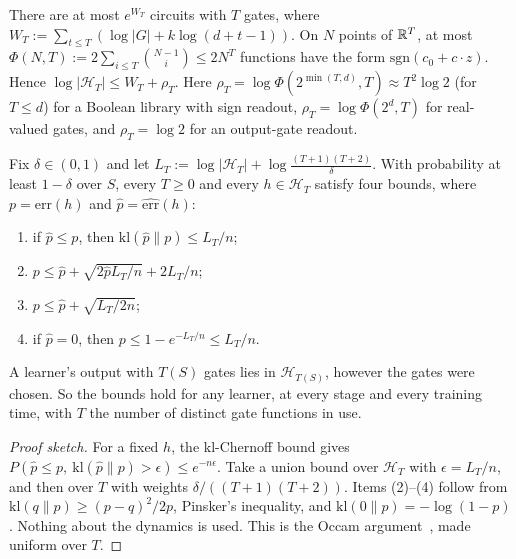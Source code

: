 \begin{lemma}\label{lem:app-disc-count}
\quad There are at most $e^{W_T}$ circuits with $T$ gates, where $W_T:=\sum_{t\le T}(\log|G|+k\log(d+t-1))$. On $N$ points of $\mathbb{R}^T$, at most $\Phi(N,T):=2\sum_{i\le T}\binom{N-1}{i}\le2N^T$ functions have the form $\mathrm{sgn}(c_0+c\cdot z)$. Hence $\log|\mathcal H_T|\le W_T+\rho_T$. Here $\rho_T=\log\Phi(2^{\min(T,d)},T)\approx T^2\log2$ (for $T\le d$) for a Boolean library with sign readout, $\rho_T=\log\Phi(2^d,T)$ for real-valued gates, and $\rho_T=\log2$ for an output-gate readout.
\end{lemma}

\begin{theorem}\label{thm:app-A1}
\quad Fix $\delta\in(0,1)$ and let $L_T:=\log|\mathcal H_T|+\log\frac{(T+1)(T+2)}{\delta}$. With probability at least $1-\delta$ over $S$, every $T\ge0$ and every $h\in\mathcal H_T$ satisfy four bounds, where $p=\mathrm{err}(h)$ and $\hat p=\widehat{\mathrm{err}}(h)$:
\begin{enumerate}[label=(\arabic*),nosep]
\item if $\hat p\le p$, then $\mathrm{kl}(\hat p\|p)\le L_T/n$;
\item $p\le\hat p+\sqrt{2\hat pL_T/n}+2L_T/n$;
\item $p\le\hat p+\sqrt{L_T/2n}$;
\item if $\hat p=0$, then $p\le1-e^{-L_T/n}\le L_T/n$.
\end{enumerate}
A learner's output with $T(S)$ gates lies in $\mathcal H_{T(S)}$, however the gates were chosen. So the bounds hold for any learner, at every stage and every training time, with $T$ the number of distinct gate functions in use.
\end{theorem}
\begin{proof}[Proof sketch]
For a fixed $h$, the kl-Chernoff bound gives $P(\hat p\le p,\ \mathrm{kl}(\hat p\|p)>\epsilon)\le e^{-n\epsilon}$. Take a union bound over $\mathcal H_T$ with $\epsilon=L_T/n$, and then over $T$ with weights $\delta/((T+1)(T+2))$. Items (2)--(4) follow from $\mathrm{kl}(q\|p)\ge(p-q)^2/2p$, Pinsker's inequality, and $\mathrm{kl}(0\|p)=-\log(1-p)$. Nothing about the dynamics is used. This is the Occam argument~\cite{blumer1987occam}, made uniform over $T$.
\end{proof}


